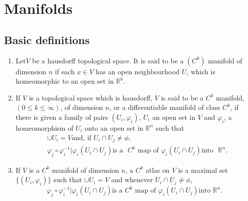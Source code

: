 \chapter{Manifolds}\label{chap2}

\section{Basic definitions}\label{chap2:sec1}

\begin{defis*} %
  \begin{enumerate} [(1)]
  \item Let\pageoriginale $V$ be a hausdorff  topological space. It is said to be a
    $(C^0)$ manifold of dimension $n$ if each $x \in V$ has an open
    neighbourhood $U$, which is homeomorphic to an open set in
    $\mathbb{R}^b$. 
  \item If $V$ is a topological space which is hausdorff, $V$ is said
    to be a $C^k$ manifold, $(0 \le k \le \infty)$, of dimension $n$,
    or a differentiable manifold of class $C^k$, if there is given a
    family of pairs $(U_i, \varphi_i)$, $U_i$ an open set in $V$ and
    $\varphi_i$, a homeomorphism of $U_i$ onto an open set in
    $\mathbb{R} ^ n $ such that  
    \begin{align*}
      & \cup U_i = V \text  {and, if } U_i \cap U_j \neq \phi,\\
      & \varphi_j \circ \varphi^{-1}_i \big | \varphi_i (U_i \cap U_j)
      \text{is a~ } C^k \text  { map of } \varphi_i (U_i \cap U_j)
      \text{into~ } \mathbb{R}^n.  
    \end{align*}
  \item If $V$ is a $C^k$ manifold of dimension $n$, a $C^k$ atlas on
    $V$ is a maximal set $\{(U_i, \varphi_i)\}$ such that $\cup U_i =
    V$ and whenever $U_i \cap U_j \neq \phi$, 
  $$
  \varphi_j \circ \varphi^{-1}_i \big | \varphi_i (U_i \cap U_j) \text {is
    a } C^k \text { map of } \varphi_i (U_i \cap U_j) \text {into }
  \mathbb{R}^n.  
  $$
  \end{enumerate}
\end{defis*}

